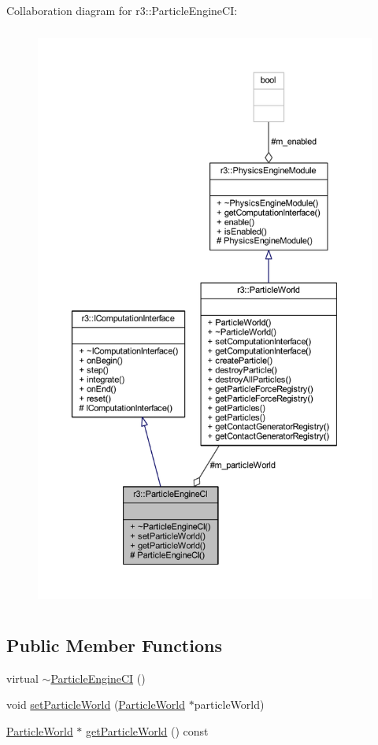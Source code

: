 Collaboration diagram for r3\+:\+:Particle\+Engine\+CI\+:\nopagebreak
\begin{figure}[H]
\begin{center}
\leavevmode
\includegraphics[height=550pt]{classr3_1_1_particle_engine_c_i__coll__graph}
\end{center}
\end{figure}
\subsection*{Public Member Functions}
\begin{DoxyCompactItemize}
\item 
virtual \mbox{\hyperlink{classr3_1_1_particle_engine_c_i_ab94f2e07fe82865bdf3845db7c47df0d}{$\sim$\+Particle\+Engine\+CI}} ()
\item 
void \mbox{\hyperlink{classr3_1_1_particle_engine_c_i_ac3e59efbd738a6cf8195f5377cc4752c}{set\+Particle\+World}} (\mbox{\hyperlink{classr3_1_1_particle_world}{Particle\+World}} $\ast$particle\+World)
\item 
\mbox{\hyperlink{classr3_1_1_particle_world}{Particle\+World}} $\ast$ \mbox{\hyperlink{classr3_1_1_particle_engine_c_i_af622bfe4b9279ffd5dcff14d43a8887b}{get\+Particle\+World}} () const
\end{DoxyCompactItemize}

